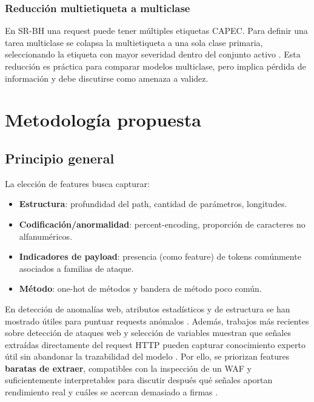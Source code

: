 \documentclass[12pt,oneside]{report}
\begin{document}
\subsection{Reducción multietiqueta a multiclase}
En SR-BH una request puede tener múltiples etiquetas CAPEC. Para definir una tarea multiclase se colapsa la multietiqueta a una sola clase primaria, seleccionando la etiqueta con mayor severidad dentro del conjunto activo \cite{capec_schema_docs,capec_schema_desc}. Esta reducción es práctica para comparar modelos multiclase, pero implica pérdida de información y debe discutirse como amenaza a validez.

\chapter{Metodología propuesta}

\section{Principio general}
La elección de features busca capturar:
\begin{itemize}[leftmargin=*]
  \item \textbf{Estructura}: profundidad del path, cantidad de parámetros, longitudes.
  \item \textbf{Codificación/anormalidad}: percent-encoding, proporción de caracteres no alfanuméricos.
  \item \textbf{Indicadores de payload}: presencia (como feature) de tokens comúnmente asociados a familias de ataque.
  \item \textbf{Método}: one-hot de métodos y bandera de método poco común.
\end{itemize}
En detección de anomalías web, atributos estadísticos y de estructura se han mostrado útiles para puntuar requests anómalos \cite{kruegel_vigna_2003}. Además, trabajos más recientes sobre detección de ataques web y selección de variables muestran que señales extraídas directamente del request HTTP pueden capturar conocimiento experto útil sin abandonar la trazabilidad del modelo \cite{riverol_2024,srbh_paper}. Por ello, se priorizan features \textbf{baratas de extraer}, compatibles con la inspección de un WAF y suficientemente interpretables para discutir después qué señales aportan rendimiento real y cuáles se acercan demasiado a firmas \cite{owasp_waf,modsecurity_site}.
\end{document}

